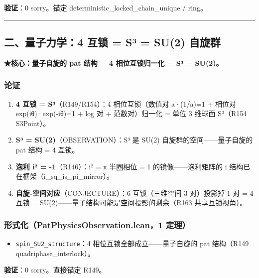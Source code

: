 \documentclass[
]{article}
\providecommand{\tightlist}{%
  \setlength{\itemsep}{0pt}\setlength{\parskip}{0pt}}
\begin{document}
\textbf{验证}：0 sorry。锚定 deterministic\_locked\_chain\_unique /
ring。

\begin{center}\rule{0.5\linewidth}{0.5pt}\end{center}

\subsection{二、量子力学：4 互锁 = S³ = SU(2)
自旋群}\label{ux4e8cux91cfux5b50ux529bux5b664-ux4e92ux9501-suxb3-su2-ux81eaux65cbux7fa4}

\textbf{★核心：量子自旋的 pat 结构 = 4 相位互锁归一化 = S³ = SU(2)。}

\subsubsection{论证}\label{ux8bbaux8bc1-1}

\begin{enumerate}
\def\labelenumi{\arabic{enumi}.}
\tightlist
\item
  \textbf{4 互锁 = S³}（R149/R154）：4 相位互锁（数值对 a·(1/a)=1 +
  相位对 exp(iθ)·exp(-iθ)=1 + log 对 + 范数对）归一化 = 单位 3 维球面
  S³（R154 S3Point）。
\item
  \textbf{S³ = SU(2)}（OBSERVATION）：S³ 是 SU(2)
  自旋群的空间------量子自旋的 pat 结构 = 4 互锁。
\item
  \textbf{泡利 i² = -1}（R146）：i² = π 半圈相位 = 1
  的镜像------泡利矩阵的 i 结构已在框架（i\_sq\_is\_pi\_mirror）。
\item
  \textbf{自旋-空间对应}（CONJECTURE）：6 互锁（三维空间 3 对）投影掉 1
  对 = 4 互锁 = SU(2)------量子结构可能是空间投影的剩余（R163
  共享互锁视角）。
\end{enumerate}

\subsubsection{形式化（PatPhysicsObservation.lean，1
定理）}\label{ux5f62ux5f0fux5316patphysicsobservation.lean1-ux5b9aux7406}

\begin{itemize}
\tightlist
\item
  \texttt{spin\_SU2\_structure}：4 相位互锁全部成立------量子自旋的 pat
  结构（R149 quadriphase\_interlock）。
\end{itemize}

\textbf{验证}：0 sorry。直接锚定 R149。
\end{document}
